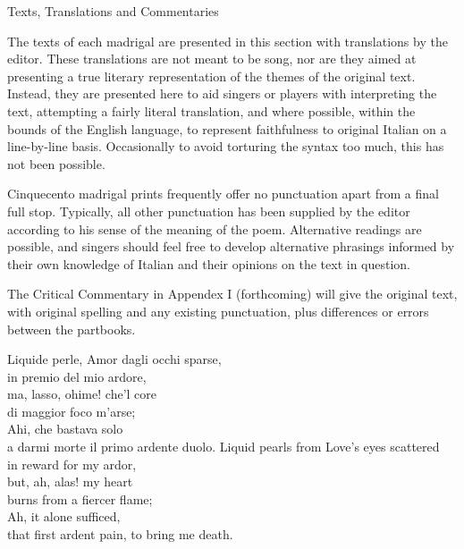 \documentclass[12pt, twocolumn]{text-translation}
\begin{document}
\clearpage
\onecolumn
\vspace*{\fill}
\begin{center}
    \Huge Texts, Translations and Commentaries
\end{center}
\vspace*{\fill}

\twocolumn

\noindentation
The texts of each madrigal are presented in this section with translations
by the editor. These translations are not meant to be song, nor are they
aimed at presenting a true literary representation of the themes of the
original text. Instead, they are presented here to aid singers or players
with interpreting the text, attempting a fairly literal translation, and
where possible, within the bounds of the English language, to represent
faithfulness to original Italian on a line-by-line basis. Occasionally to
avoid torturing the syntax too much, this has not been possible.

\indented
Cinquecento madrigal prints frequently offer no punctuation apart from a final
full stop. Typically, all other punctuation has been supplied by the editor
according to his sense of the meaning of the poem. Alternative readings are
possible, and singers should feel free to develop alternative phrasings
informed by their own knowledge of Italian and their opinions on the text
in question.

\indented
The Critical Commentary in Appendex I (forthcoming) will give the original text, with
original spelling and any existing punctuation, plus differences or errors
between the partbooks.


Liquide perle, Amor dagli occhi sparse, \\
in premio del mio ardore, \\
ma, lasso, ohime! che'l core \\
di maggior foco m'arse; \\
Ahi, che bastava solo \\
a darmi morte il primo ardente duolo.
\poemasterisks
Liquid pearls from Love's eyes scattered \\
in reward for my ardor, \\
but, ah, alas! my heart \\
burns from a fiercer flame; \\
Ah, it alone sufficed, \\
that first ardent pain, to bring me death. 
\end{document}
